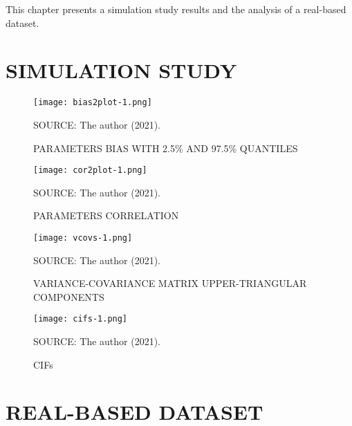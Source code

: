 This chapter presents a simulation study results and the analysis of a
real-based dataset.

\section{SIMULATION STUDY}
\label{cap:simures}

\begin{figure}[H]
 \setlength{\abovecaptionskip}{.0001pt}
 \caption{PARAMETERS BIAS WITH 2.5\% AND 97.5\% QUANTILES}
 \vspace{0.2cm}\centering
 \texttt{[image: bias2plot-1.png]}\\
 \begin{footnotesize}
  SOURCE: The author (2021).
 \end{footnotesize}
 \label{fig:bias2plot}
\end{figure}

\begin{figure}[H]
 \setlength{\abovecaptionskip}{.0001pt}
 \caption{PARAMETERS CORRELATION}
 \vspace{0.2cm}\centering
 \texttt{[image: cor2plot-1.png]}\\
 \begin{footnotesize}
  SOURCE: The author (2021).
 \end{footnotesize}
 \label{fig:cor2plot}
\end{figure}

\begin{figure}[H]
 \setlength{\abovecaptionskip}{.0001pt}
 \caption{VARIANCE-COVARIANCE MATRIX UPPER-TRIANGULAR COMPONENTS}
 \vspace{0.2cm}\centering
 \texttt{[image: vcovs-1.png]}\\
 \begin{footnotesize}
  SOURCE: The author (2021).
 \end{footnotesize}
 \label{fig:vcovs}
\end{figure}

\begin{figure}[H]
 \setlength{\abovecaptionskip}{.0001pt}
 \caption{CIFs}
 \vspace{0.2cm}\centering
 \texttt{[image: cifs-1.png]}\\
 \begin{footnotesize}
  SOURCE: The author (2021).
 \end{footnotesize}
 \label{fig:cifs}
\end{figure}

\section{REAL-BASED DATASET}
\label{cap:datares}

